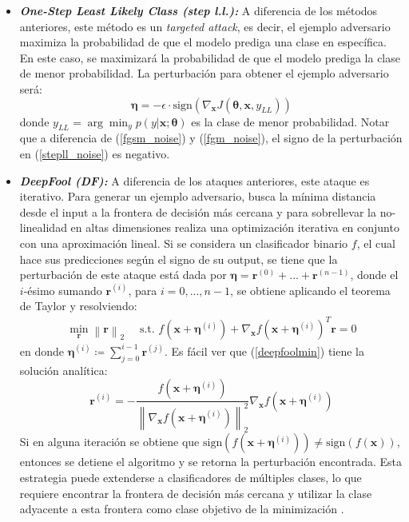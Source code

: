 \documentclass[conference]{IEEEtran}
\newcommand{\norm}[1]{\left\lVert#1\right\rVert}
\begin{document}
\begin{itemize}
\item \textbf{\textit{One-Step Least Likely Class (step l.l.):}} A diferencia de los métodos anteriores, este método es un \textit{targeted attack}, es decir, el ejemplo adversario maximiza la probabilidad de que el modelo prediga una clase en específica. En este caso, se maximizará la probabilidad de que el modelo prediga la clase de menor probabilidad. La perturbación para obtener el ejemplo adversario será:
\begin{equation}\label{stepll_noise}
	\bm{\eta}=-\epsilon\cdot \text{sign}(\nabla_{\bm{x}}J(\bm{\theta}, \bm{x}, y_{LL}))
\end{equation}
donde $y_{LL}=\arg \min_{y} p(y | \bm{x}; \bm{\theta})$ es la clase de menor probabilidad. Notar que a diferencia de (\ref{fgsm_noise}) y (\ref{fgm_noise}), el signo de la perturbación en (\ref{stepll_noise}) es negativo.
\item \textbf{\textit{DeepFool (DF):}} A diferencia de los ataques anteriores, este ataque es iterativo. Para generar un ejemplo adversario, busca la mínima distancia desde el input a la frontera de decisión más cercana y para sobrellevar la no-linealidad en altas dimensiones realiza una optimización iterativa en conjunto con una aproximación lineal. Si se considera un clasificador binario $f$, el cual hace sus predicciones según el signo de su output, se tiene que la perturbación de este ataque está dada por $\bm{\eta}=\bm{r}^{(0)} + ... + \bm{r}^{(n-1)}$, donde el $i$-ésimo sumando $\bm{r}^{(i)}$, para $i=0,...,n-1$, se obtiene aplicando el teorema de Taylor y resolviendo:
	\begin{align}
		\min_{\bm{r}} \norm{\bm{r}}_{2} \quad \text{ s.t. } f(\bm{x} + \bm{\eta}^{(i)}) + \nabla_{\bm{x}}f(\bm{x}+\bm{\eta}^{(i)})^{T}\bm{r}=0
		\label{deepfoolmin}
	\end{align}
	en donde $\bm{\eta}^{(i)} \coloneqq \sum_{j=0}^{i-1}\bm{r}^{(j)}$. Es fácil ver que (\ref{deepfoolmin}) tiene la solución analítica: 
\begin{equation}
	\bm{r}^{(i)} = -\frac{f(\bm{x} + \bm{\eta}^{(i)})}{\norm{\nabla_{\bm{x}} f(\bm{x} + \bm{\eta}^{(i)})}^{2}_{2}} \nabla_{\bm{x}} f(\bm{x} + \bm{\eta}^{(i)})
	\end{equation}
Si en alguna iteración se obtiene que $\text{sign}(f(\bm{x}+\bm{\eta}^{(i)})) \neq \text{sign}(f(\bm{x}))$, entonces se detiene el algoritmo y se retorna la perturbación encontrada. Esta estrategia puede extenderse a clasificadores de múltiples clases, lo que requiere encontrar la frontera de decisión más cercana y utilizar la clase adyacente a esta frontera como clase objetivo de la minimización \cite{deepdefense, yuan2017}.
\end{itemize}
\end{document}
